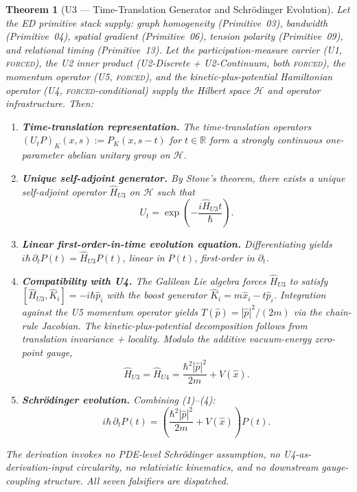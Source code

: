 \documentclass[11pt,a4paper]{article}
\newtheorem{theorem}{Theorem}[section]
\begin{document}
\begin{theorem}[U3 --- Time-Translation Generator and Schr\"odinger Evolution]
Let the ED primitive stack supply: graph homogeneity (Primitive~03), bandwidth (Primitive~04), spatial gradient (Primitive~06), tension polarity (Primitive~09), and relational timing (Primitive~13). Let the participation-measure carrier (U1, \textsc{forced}), the U2 inner product (U2-Discrete + U2-Continuum, both \textsc{forced}), the momentum operator (U5, \textsc{forced}), and the kinetic-plus-potential Hamiltonian operator (U4, \textsc{forced}-conditional) supply the Hilbert space $\mathcal{H}$ and operator infrastructure. Then:

\begin{enumerate}
  \item \textbf{Time-translation representation.} The time-translation operators $(U_t P)_K(x, s) := P_K(x, s - t)$ for $t \in \mathbb{R}$ form a strongly continuous one-parameter abelian unitary group on $\mathcal{H}$.

  \item \textbf{Unique self-adjoint generator.} By Stone's theorem, there exists a unique self-adjoint operator $\hat{H}_{U3}$ on $\mathcal{H}$ such that
  \[
  U_t = \exp\!\left(-\frac{i \hat{H}_{U3} t}{\hbar}\right).
  \]

  \item \textbf{Linear first-order-in-time evolution equation.} Differentiating yields $i\hbar \, \partial_t P(t) = \hat{H}_{U3} P(t)$, linear in $P(t)$, first-order in $\partial_t$.

  \item \textbf{Compatibility with U4.} The Galilean Lie algebra forces $\hat{H}_{U3}$ to satisfy $[\hat{H}_{U3}, \hat{K}_i] = -i\hbar\hat{p}_i$ with the boost generator $\hat{K}_i = m\hat{x}_i - t\hat{p}_i$. Integration against the U5 momentum operator yields $T(\hat{p}) = |\hat{p}|^2/(2m)$ via the chain-rule Jacobian. The kinetic-plus-potential decomposition follows from translation invariance + locality. Modulo the additive vacuum-energy zero-point gauge,
  \[
  \hat{H}_{U3} = \hat{H}_{U4} = \frac{\hbar^2 |\hat{p}|^2}{2m} + V(\hat{x}).
  \]

  \item \textbf{Schr\"odinger evolution.} Combining (1)--(4):
  \[
  i\hbar \, \partial_t P(t) = \left( \frac{\hbar^2 |\hat{p}|^2}{2m} + V(\hat{x}) \right) P(t).
  \]
\end{enumerate}

The derivation invokes no PDE-level Schr\"odinger assumption, no U4-as-derivation-input circularity, no relativistic kinematics, and no downstream gauge-coupling structure. All seven falsifiers are dispatched.
\end{theorem}
\end{document}
